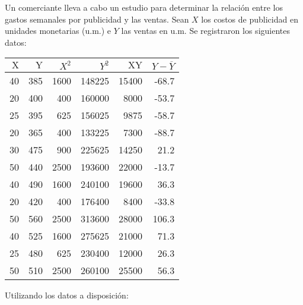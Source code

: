 
\addpoints
\question[12] Un comerciante lleva a cabo un estudio para determinar la relación entre los gastos semanales por publicidad y las ventas. Sean $X$ los costos de publicidad en unidades monetarias (u.m.) e $Y$ las ventas en u.m. Se registraron los siguientes datos:
\begin{table}[h!]
    \centering
    \begin{tabular}{rrrrrr}
        $\mathrm{X}$ & $\mathrm{Y}$ & $X^2$ & $Y^2$ & $\mathrm{XY}$ & $Y-\overline{Y}$ \\
        \hline 40 & 385 & 1600 & 148225 & 15400 & -68.7 \\
        20 & 400 & 400 & 160000 & 8000 & -53.7 \\
        25 & 395 & 625 & 156025 & 9875 & -58.7 \\
        20 & 365 & 400 & 133225 & 7300 & -88.7 \\
        30 & 475 & 900 & 225625 & 14250 & 21.2 \\
        50 & 440 & 2500 & 193600 & 22000 & -13.7 \\
        40 & 490 & 1600 & 240100 & 19600 & 36.3 \\
        20 & 420 & 400 & 176400 & 8400 & -33.8 \\
        50 & 560 & 2500 & 313600 & 28000 & 106.3 \\
        40 & 525 & 1600 & 275625 & 21000 & 71.3 \\
        25 & 480 & 625 & 230400 & 12000 & 26.3 \\
        50 & 510 & 2500 & 260100 & 25500 & 56.3 \\
        \hline
    \end{tabular}
\end{table}
Utilizando los datos a disposición:
\noaddpoints
{}

